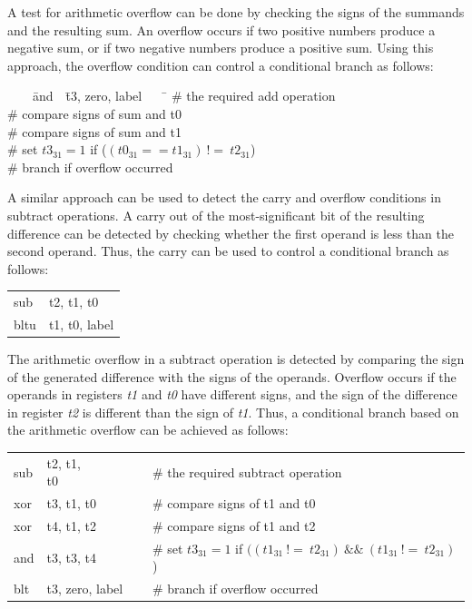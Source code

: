 \documentclass[11pt, twoside, pdftex]{article}
\newenvironment{ctabbing}%
{\begin{center}\begin{minipage}{\textwidth}\begin{tabbing}}
{\end{tabbing}\end{minipage}\end{center}}
\begin{document}
A test for arithmetic overflow can be done by checking the signs of the summands and the resulting
sum. An overflow occurs if two positive numbers produce a negative sum, or if two negative numbers
produce a positive sum. Using this approach, the overflow condition can control a conditional
branch as follows:
\vspace{-\baselineskip}
\begin{ctabbing}
~~~~\={\sf and}~~\={\sf t3, zero, label}~~~~\=\kill
{}  \>\# the required add operation\\
  \>\# compare signs of sum and t0 \\
  \>\# compare signs of sum and t1 \\
  \>\# set $\mathit{t3}_{31} = 1$ if ($(\mathit{t0}_{31} == \mathit{t1}_{31})~!=~\mathit{t2}_{31}$)\\
  \>\# branch if overflow occurred
\end{ctabbing}
\vspace{-\baselineskip}
A similar approach can be used to detect the carry and overflow conditions in subtract operations.
A carry out of the most-significant bit of the resulting difference can be detected by checking 
whether the first operand is less than the second operand. Thus, the carry can be used to control 
a conditional branch as follows:
\begin{center}
\begin{tabular}{ll}
{\sf sub} & {\sf t2, t1, t0} \\
{\sf bltu} & {\sf t1, t0, label}
\end{tabular}
\end{center}

\noindent
The arithmetic overflow in a subtract operation is detected by comparing the sign of the generated 
difference with the signs of the operands. Overflow occurs if the operands in registers
{\it t1} and {\it t0} have different signs, and the sign of the difference in register 
{\it t2} is different than the sign of {\it t1}.
Thus, a conditional branch based on the arithmetic overflow can be achieved as follows:
\begin{center}
\begin{tabular}{lll}
{\sf sub} & {\sf t2, t1, t0}~~~~~~~ & \# the required subtract operation \\
{\sf xor} & {\sf t3, t1, t0}  & \# compare signs of t1 and t0 \\
{\sf xor} & {\sf t4, t1, t2}  & \# compare signs of t1 and t2 \\
{\sf and} & {\sf t3, t3, t4}  & \# set $\mathit{t3}_{31} = 1$ if $((\mathit{t1}_{31}~!=~\mathit{t2}_{31})~\&\&~(\mathit{t1}_{31}~!=~\mathit{t2}_{31})$) \\
{\sf blt} & {\sf t3, zero, label} & \# branch if overflow occurred
\end{tabular}
\end{center}
 
\end{document}
